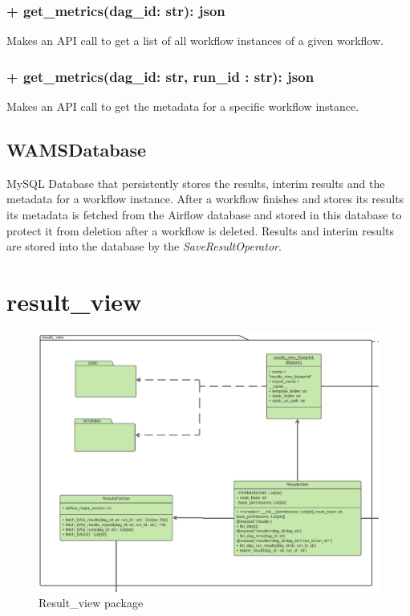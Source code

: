 \subsubsection{+ get\_metrics(dag\_id: str): json}
Makes an API call to get a list of all workflow instances of a given workflow.

\subsubsection{+ get\_metrics(dag\_id: str, run\_id : str): json}
Makes an API call to get the metadata for a specific workflow instance.


\subsection{WAMSDatabase}
MySQL Database that persistently stores the results, interim results and the metadata for a workflow instance. After a workflow finishes and stores its results its metadata is fetched from the Airflow database and stored in this database to protect it from deletion after a workflow is deleted.
Results and interim results are stored into the database by the \textit{SaveResultOperator}.

\section{result\_view}

\begin{figure} [ht]
    \centering
    \includegraphics[width = \textwidth]{Diagramme/KlassendiagrammAusschnitte/Klassendiagramm -results view.png}
    \caption{Result\_view package}
    \label{fig:results section}
\end{figure}

